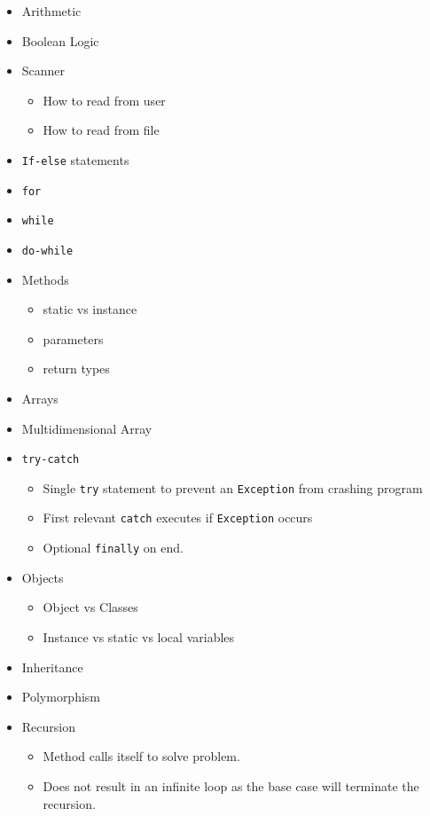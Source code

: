 \documentclass[]{article}
\begin{document}
\begin{itemize}
\begin{itemize}
\begin{itemize}
		\end{itemize}
	\end{itemize}
	\item Arithmetic
	\item Boolean Logic
	\item Scanner
	\begin{itemize}
		\item How to read from user
		\item How to read from file
	\end{itemize}
	\item \texttt{If-else} statements
	\item \texttt{for}
	\item \texttt{while}
	\item \texttt{do-while}
	\item Methods
	\begin{itemize}
		\item static vs instance
		\item parameters
		\item return types
	\end{itemize}
	\item Arrays
	\item Multidimensional Array
	\item \texttt{try-catch}
	\begin{itemize}
		\item Single \texttt{try} statement to prevent an \texttt{Exception} from crashing program
		\item First relevant \texttt{catch} executes if \texttt{Exception} occurs
		\item Optional \texttt{finally} on end.
	\end{itemize}
	\item Objects
	\begin{itemize}
		\item Object vs Classes
		\item Instance vs static vs local variables
	\end{itemize}
	\item Inheritance 
	\item Polymorphism
	\item Recursion
	\begin{itemize}
		\item Method calls itself to solve problem.
		\item Does not result in an infinite loop as the base case will terminate the recursion.
	\end{itemize} 
\end{itemize}
\end{document}
